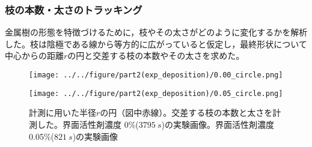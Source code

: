 \documentclass[autodetect-engine,dvi=dvipdfmx,a4paper,ja=standard,oneside,openany,11pt,draft]{bxjsbook}
\begin{document}
\begin{enumerate}
\subsubsection{枝の本数・太さのトラッキング}
金属樹の形態を特徴づけるために，枝やその太さがどのように変化するかを解析した。枝は陰極である線から等方的に広がっていると仮定し，最終形状について中心からの距離$r$の円と交差する枝の本数やその太さを求めた。
\begin{figure}[htbp]
  \begin{minipage}
    {0.5\textwidth}
    \subcaption{}
    \centering
    \texttt{[image: ../../figure/part2(exp\_deposition)/0.00\_circle.png]}
    \label{fig:0.00_circle}
  \end{minipage}
  \begin{minipage}
    {0.5\textwidth}
    \subcaption{}
    \centering
    \texttt{[image: ../../figure/part2(exp\_deposition)/0.05\_circle.png]}
    \label{fig:0.05_circle}
  \end{minipage}
  \caption{計測に用いた半径$r$の円（図中赤線）。交差する枝の本数と太さを計測した。界面活性剤濃度 0\%($\SI{3795}{s}$)の実験画像。界面活性剤濃度 0.05\%($\SI{821}{s}$)の実験画像}
\end{figure}

\end{enumerate}
\end{document}
